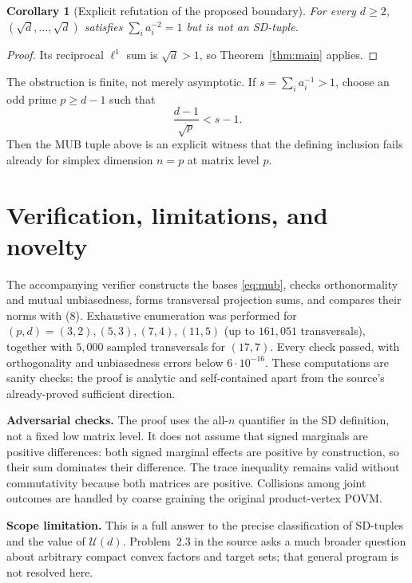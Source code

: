\documentclass[11pt]{article}
\newtheorem{corollary}[theorem]{Corollary}
\begin{document}
\begin{corollary}[Explicit refutation of the proposed boundary]
For every $d\geq2$, $(\sqrt d,\ldots,\sqrt d)$ satisfies
$\sum_i a_i^{-2}=1$ but is not an SD-tuple.
\end{corollary}

\begin{proof}
Its reciprocal $\ell^1$ sum is $\sqrt d>1$, so
Theorem~\ref{thm:main} applies.
\end{proof}

The obstruction is finite, not merely asymptotic.  If
$s=\sum_i a_i^{-1}>1$, choose an odd prime $p\geq d-1$ such that
\begin{equation}
 \frac{d-1}{\sqrt p}<s-1.
\end{equation}
Then the MUB tuple above is an explicit witness that the defining inclusion
fails already for simplex dimension $n=p$ at matrix level $p$.

\section{Verification, limitations, and novelty}

The accompanying verifier constructs the bases \eqref{eq:mub}, checks orthonormality
and mutual unbiasedness, forms transversal projection sums, and compares
their norms with (8).  Exhaustive enumeration was performed for
$(p,d)=(3,2),(5,3),(7,4),(11,5)$ (up to $161{,}051$ transversals), together
with $5{,}000$ sampled transversals for $(17,7)$.  Every check passed, with
orthogonality and unbiasedness errors below $6\cdot10^{-16}$.  These
computations are sanity checks; the proof is analytic and self-contained
apart from the source's already-proved sufficient direction.

\textbf{Adversarial checks.}  The proof uses the all-$n$ quantifier in the SD
definition, not a fixed low matrix level.  It does not assume that signed
marginals are positive differences: both signed marginal effects are
positive by construction, so their sum dominates their difference.  The
trace inequality remains valid without commutativity because both matrices
are positive.  Collisions among joint outcomes are handled by coarse
graining the original product-vertex POVM.

\textbf{Scope limitation.}  This is a full answer to the precise
classification of SD-tuples and the value of $\mathcal U(d)$.  Problem~2.3
in the source asks a much broader question about arbitrary compact convex
factors and target sets; that general program is not resolved here.
\end{document}

